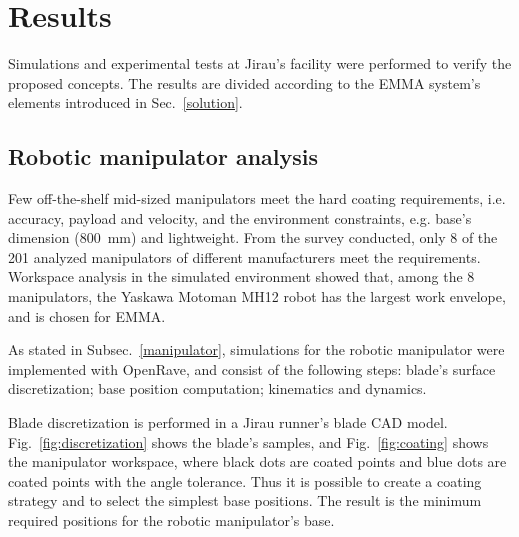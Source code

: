 \section{Results}



Simulations and experimental tests at Jirau's facility were performed to verify
the proposed concepts. The results are divided according to the EMMA system's
elements introduced in Sec.~\ref{solution}. 

\subsection{Robotic manipulator analysis}\label{sec::man_analysis}

Few off-the-shelf mid-sized manipulators meet the hard coating requirements,
i.e. accuracy, payload and velocity, and the environment constraints, e.g.
base's dimension (800~mm) and lightweight. From the survey conducted, only 8 of
the 201 analyzed manipulators of different manufacturers meet the requirements.
Workspace analysis in the simulated environment showed that, among the 8
manipulators, the Yaskawa Motoman MH12 robot has the largest work envelope, and
is chosen for EMMA.

As stated in Subsec.~\ref{manipulator}, simulations for the robotic
manipulator were implemented with OpenRave, and consist of the following steps:
blade's surface discretization; base position computation; kinematics
and dynamics.

Blade discretization is performed in a Jirau runner's blade CAD model.
Fig.~\ref{fig:discretization} shows the blade's samples, and
Fig.~\ref{fig:coating} shows the manipulator workspace, where black dots are
coated points and blue dots are coated points with the angle tolerance.
Thus it is possible to create a coating strategy and to select the simplest base
positions. The result is the minimum required positions for the robotic
manipulator's base.

